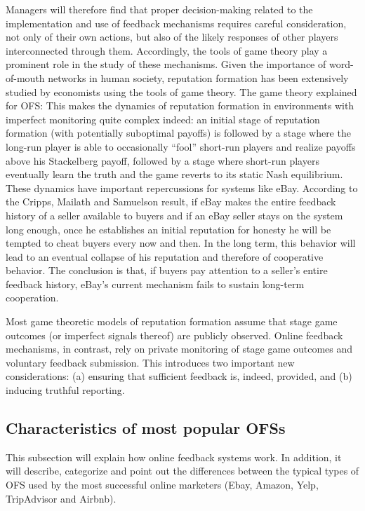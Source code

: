 \documentclass[a4paper, 11pt]{article}
\begin{document}
Managers will therefore find that proper decision-making related to the implementation and use
of feedback mechanisms requires careful consideration, not only of their own actions, but also of
the likely responses of other players interconnected through them. Accordingly, the tools of
game theory play a prominent role in the study of these mechanisms. Given the importance of word-of-mouth networks in human society, reputation formation has
been extensively studied by economists using the tools of game theory. The game theory explained for OFS:
This makes the dynamics of reputation formation in
environments with imperfect monitoring quite complex indeed: an initial stage of reputation
formation (with potentially suboptimal payoffs) is followed by a stage where the long-run player
is able to occasionally “fool” short-run players and realize payoffs above his Stackelberg payoff,
followed by a stage where short-run players eventually learn the truth and the game reverts to its
static Nash equilibrium.
These dynamics have important repercussions for systems like eBay. According to the Cripps,
Mailath and Samuelson result, if eBay makes the entire feedback history of a seller available to
buyers and if an eBay seller stays on the system long enough, once he establishes an initial
reputation for honesty he will be tempted to cheat buyers every now and then. In the long term,
this behavior will lead to an eventual collapse of his reputation and therefore of cooperative behavior. The conclusion is that, if buyers pay attention to a seller’s entire feedback history,
eBay’s current mechanism fails to sustain long-term cooperation.

Most game theoretic models of reputation formation assume that stage game outcomes (or
imperfect signals thereof) are publicly observed. Online feedback mechanisms, in contrast, rely
on private monitoring of stage game outcomes and voluntary feedback submission. This
introduces two important new considerations: (a) ensuring that sufficient feedback is, indeed,
provided, and (b) inducing truthful reporting.

\subsection{Characteristics of most popular OFSs}
\label{subsec:popularOFS}

This subsection will explain how online feedback systems work. In addition, it will describe, categorize and point out the differences between the typical types of OFS used by the most successful online marketers (Ebay, Amazon, Yelp, TripAdvisor and Airbnb). 
\end{document}
